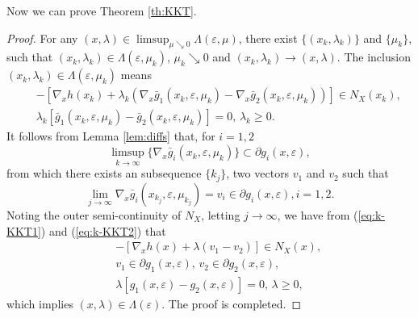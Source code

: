 Now we can prove Theorem \ref{th:KKT}.

\begin{proof}
For any $(x,\lambda)\in \limsup_{\mu\searrow
0}\Lambda(\varepsilon,\mu)$, there exist $\{(x_k,\lambda_k)\}$ and
$\{\mu_k\}$, such that $(x_k,\lambda_k)\in
\Lambda(\varepsilon,\mu_k)$, $\mu_k\searrow 0$ and
$(x_k,\lambda_k)\rightarrow (x,\lambda)$. The inclusion
$(x_k,\lambda_k)\in \Lambda(\varepsilon,\mu_k)$ means
\begin{eqnarray}
&& -\left[\nabla_x h(x_k)+\lambda_k(\nabla_x\bar
g_1(x_k,\varepsilon,\mu_k)-\nabla_x\bar
g_2(x_k,\varepsilon,\mu_k))\right]\in N_{X}(x_k),\label{eq:k-KKT1}\\
&&\lambda_k \left[\bar g_1(x_k,\varepsilon,\mu_k)-\bar
g_2(x_k,\varepsilon,\mu_k)\right]=0,\, \lambda_k\geq 0.
\label{eq:k-KKT2}
\end{eqnarray}
It follows from Lemma \ref{lem:diffs} that, for $i=1,2$
\[\limsup_{k\rightarrow\infty}\{\nabla_x\bar
g_i(x_k,\varepsilon,\mu_k)\}\subset\partial g_i(x,\varepsilon),\]
from which there exists an subsequence $\{k_j\}$, two vectors $v_1$
and $v_2$ such that
\[\displaystyle\lim_{j\rightarrow \infty}\nabla_x\bar
g_i(x_{k_j},\varepsilon,\mu_{k_j})=v_i\in \partial
g_i(x,\varepsilon), i=1,2.\] Noting the outer semi-continuity of
$N_{X}$, letting $j\rightarrow \infty$, we have from
(\ref{eq:k-KKT1}) and (\ref{eq:k-KKT2}) that
\[\begin{array}{lll}
&& -\left[\nabla_x h(x)+\lambda(v_1-v_2)\right]\in N_{X}(x),\\[6pt]
&&v_1 \in \partial g_1(x,\varepsilon), \, v_2\in \partial
g_2(x,\varepsilon),\\[6pt]
&&\lambda\left[g_1(x,\varepsilon)-g_2(x,\varepsilon)\right]=0,\,
\lambda \geq 0,
\end{array}\]
which implies $(x,\lambda)\in \Lambda(\varepsilon)$. The proof is
completed.
\end{proof}



